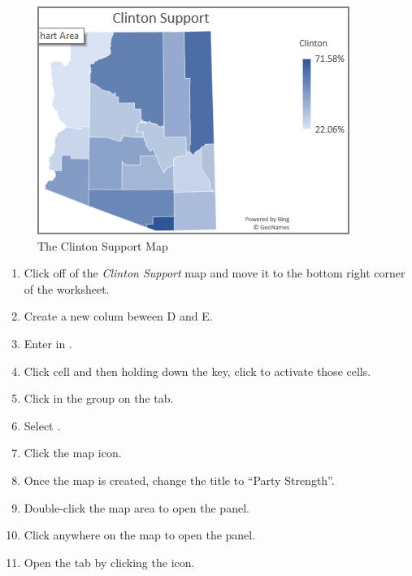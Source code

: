 \begin{figure}[H]
	\centering
	\includegraphics[width=\maxwidth{.95\linewidth}]{gfx/ch08_fig41}
	\caption{The Clinton Support Map}
	\label{08:fig41}
\end{figure}

\begin{enumerate}[resume]
	\item Click off of the \textit{Clinton Support} map and move it to the bottom right corner of the worksheet.
	\item Create a new colum beween D and E.
	\item Enter  in .
	\item Click cell  and then holding down the  key, click  to activate those cells.
	\item Click  in the  group on the  tab.
	\item Select .
	\item Click the map icon.
	\item Once the map is created, change the title to ``Party Strength''.
	\item Double-click the map area to open the  panel.
	\item Click anywhere on the map to open the  panel.
	\item Open the  tab by clicking the  icon.
	
\end{enumerate}

